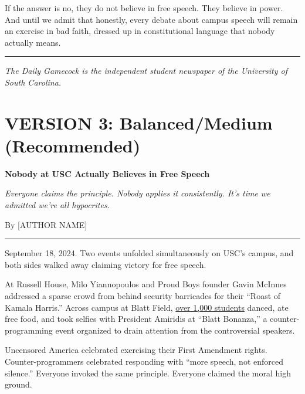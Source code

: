 \documentclass[11pt]{article}
\begin{document}
If the answer is no, they do not believe in free speech. They believe in power. And until we admit that honestly, every debate about campus speech will remain an exercise in bad faith, dressed up in constitutional language that nobody actually means.

\vspace{0.5cm}
\hrule
\vspace{0.3cm}
{\small\textit{The Daily Gamecock is the independent student newspaper of the University of South Carolina.}}

\newpage


\section{VERSION 3: Balanced/Medium (Recommended)}
\vspace{1cm}

{\LARGE\bfseries Nobody at USC Actually Believes in Free Speech}

\vspace{0.3cm}
{\large\textit{Everyone claims the principle. Nobody applies it consistently. It's time we admitted we're all hypocrites.}}

\vspace{0.3cm}
By [AUTHOR NAME]

\vspace{0.5cm}
\hrule
\vspace{0.5cm}

\onehalfspacing

September 18, 2024. Two events unfolded simultaneously on USC's campus, and both sides walked away claiming victory for free speech.

At Russell House, Milo Yiannopoulos and Proud Boys founder Gavin McInnes addressed a sparse crowd from behind security barricades for their ``Roast of Kamala Harris.'' Across campus at Blatt Field, \href{https://www.dailygamecock.com/article/2024/09/over-1000-students-attend-blatt-bonanza-during-controversial-campus-event-news-grady}{over 1,000 students} danced, ate free food, and took selfies with President Amiridis at ``Blatt Bonanza,'' a counter-programming event organized to drain attention from the controversial speakers.

Uncensored America celebrated exercising their First Amendment rights. Counter-programmers celebrated responding with ``more speech, not enforced silence.'' Everyone invoked the same principle. Everyone claimed the moral high ground.
\end{document}
